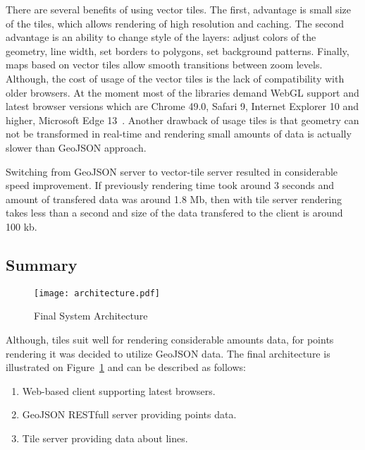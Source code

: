 There are several benefits of using vector tiles. The first, advantage is small size of the tiles,
which allows rendering of high resolution and caching. The second advantage is an ability to change
style of the layers: adjust colors of the geometry, line width, set borders to polygons,
set background patterns. Finally, maps based on vector tiles allow smooth transitions between
zoom levels. Although, the cost of usage of the vector tiles is the lack of
compatibility with older browsers. At the moment most of the libraries demand WebGL support and
latest browser versions which are Chrome 49.0, Safari 9, Internet Explorer 10 and higher,
Microsoft Edge 13~\cite{google:support,mapbox:support}. Another drawback of usage tiles is
that geometry can not be transformed in real-time and rendering small amounts of data is actually
slower than GeoJSON approach.

Switching from GeoJSON server to vector-tile server resulted in considerable speed improvement.
If previously rendering time took around 3 seconds and amount of transfered data was around 1.8 Mb,
then with tile server rendering takes less than a second and size of the data transfered to the
client is around 100 kb.

\subsection{ Summary }

\begin{figure}[t!]
    \centering
    \texttt{[image: architecture.pdf]}
    \caption{Final System Architecture}
    \label{pic:architecture}
\end{figure}

Although, tiles suit well for rendering considerable amounts data, for points rendering it was
decided to utilize GeoJSON data. The final architecture is illustrated on
Figure~\ref{pic:architecture} and can be described as follows:

\begin{enumerate}
  \item Web-based client supporting latest browsers.
  \item GeoJSON RESTfull server providing points data.
  \item Tile server providing data about lines.
\end{enumerate}
